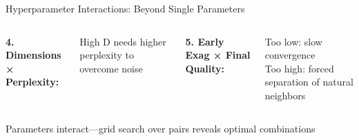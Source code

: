 \documentclass[aspectratio=169]{beamer}
\begin{document}
\begin{frame}{Hyperparameter Interactions: Beyond Single Parameters}
\begin{columns}
\vspace{0.2cm}
\textbf{4. Dimensions × Perplexity:}

High D needs higher perplexity to overcome noise

\textbf{5. Early Exag × Final Quality:}

Too low: slow convergence\\
Too high: forced separation of natural neighbors
\end{columns}

\vspace{0.3cm}
\colorbox{green!20}{\parbox{0.95\textwidth}{\centering Parameters interact—grid search over pairs reveals optimal combinations}}
\end{frame}

\end{document}

